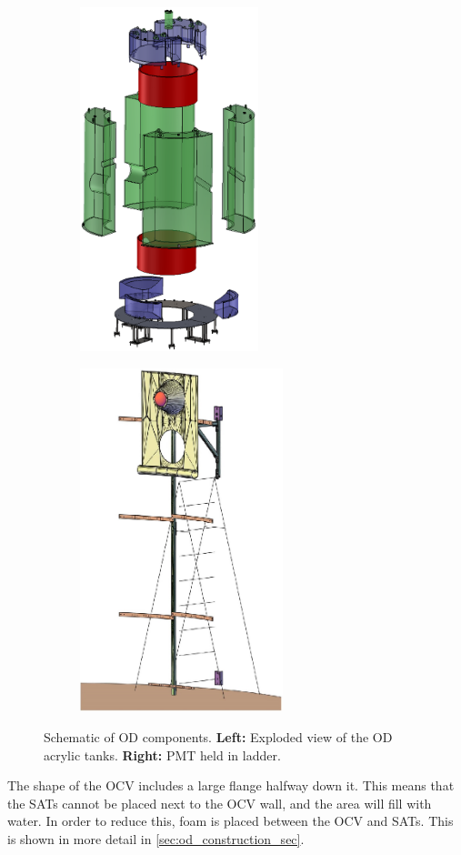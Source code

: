 \begin{figure}[]
  \begin{subfigure}{.5\textwidth}
  \centering
  \includegraphics[height=10cm]{Figures/LZ/OD_Tanks_CAD.png}
  \end{subfigure}
  \begin{subfigure}{.5\textwidth}
  \centering
  \includegraphics[height=10cm]{Figures/LZ/pmt_in_ladder.png}
  \end{subfigure}
\caption{Schematic of OD components. \textbf{Left:} Exploded view of the OD acrylic tanks. \textbf{Right:} PMT held in ladder.}
\label{fig:LZ_OD_schematic}
\end{figure}

\par
The shape of the OCV includes a large flange halfway down it. 
This means that the SATs cannot be placed next to the OCV wall, and the area will fill with water.
In order to reduce this, foam is placed between the OCV and SATs.
This is shown in more detail in \autoref{sec:od_construction_sec}.

